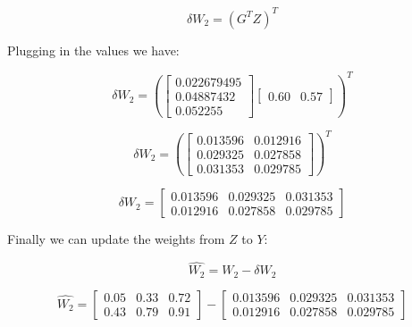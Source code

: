 \documentclass[a4paper]{article}
\begin{document}
\begin{equation}
  \delta{W_{2}}=(G^{T}Z)^{T}
\end{equation}

Plugging in the values we have:

\begin{equation}
  \delta{W_{2}}=(\begin{bmatrix}
                  0.022679495 \\
                  0.04887432 \\
                  0.052255
                \end{bmatrix}
                \begin{bmatrix}
                  0.60 & 0.57
                \end{bmatrix})^{T}
\end{equation}

\begin{equation}
  \delta{W_{2}}=(\begin{bmatrix}
                  0.013596 & 0.012916 \\
                  0.029325 & 0.027858 \\
                  0.031353 & 0.029785
                \end{bmatrix})^{T}
\end{equation}

\begin{equation}
  \delta{W_{2}}=\begin{bmatrix}
                  0.013596 & 0.029325 & 0.031353 \\
                  0.012916 & 0.027858 & 0.029785
                \end{bmatrix}
\end{equation}

Finally we can update the weights from $Z$ to $Y$:

\begin{equation}
  \widehat{W_{2}}=W_{2} - \delta{W_{2}}
\end{equation}

\begin{equation}
  \widehat{W_{2}}=
    \begin{bmatrix}
      0.05 & 0.33 & 0.72 \\
      0.43 & 0.79 & 0.91
    \end{bmatrix}
    -
    \begin{bmatrix}
      0.013596 & 0.029325 & 0.031353 \\
      0.012916 & 0.027858 & 0.029785
    \end{bmatrix}
\end{equation}
\end{document}
